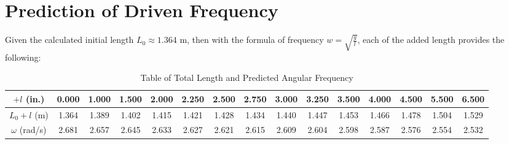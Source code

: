 \documentclass{article}
\begin{document}
\hfil

\section{Prediction of Driven Frequency}
Given the calculated initial length $L_0 \approx 1.364$ m, then with the formula of frequency $w =\sqrt{\frac{g}{l}}$, each of the added length provides the following:
\begin{table}[h!]
\centering
\begin{tabular}{c||cccccccccccccc}
\hline
$+l$ (in.) &
0.000 & 1.000 & 1.500 & 2.000 & 2.250 & 2.500 & 2.750 &
3.000 & 3.250 & 3.500 & 4.000 & 4.500 & 5.500 & 6.500 \\
\hline
$L_0+l$ (m) &
1.364 & 1.389 & 1.402 & 1.415 & 1.421 & 1.428 & 1.434 &
1.440 & 1.447 & 1.453 & 1.466 & 1.478 & 1.504 & 1.529 \\
\hline
$\omega$ (rad/s) &
2.681 & 2.657 & 2.645 & 2.633 & 2.627 & 2.621 & 2.615 &
2.609 & 2.604 & 2.598 & 2.587 & 2.576 & 2.554 & 2.532 \\
\hline
\end{tabular}
\caption{Table of Total Length and Predicted Angular Frequency}
\label{tab:predict_w}
\end{table}

\hfil
\end{document}
